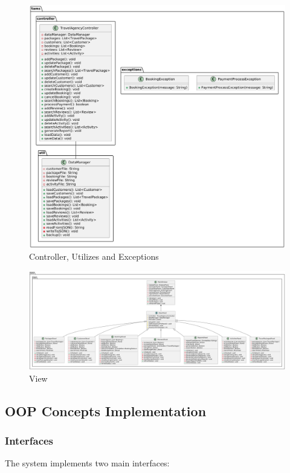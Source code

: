 \documentclass[12pt]{article}
\begin{document}
\begin{figure}[H]
\centering
\includegraphics[width=\textwidth]{uml3.png}
\caption{Controller, Utilizes and Exceptions}
\end{figure}

\begin{figure}[H]
    \centering
    \includegraphics[width=\textwidth]{uml2.png}
    \caption{View}
    \end{figure}
\newpage

\subsection{OOP Concepts Implementation}

\subsubsection{Interfaces}
The system implements two main interfaces:
\end{document}
